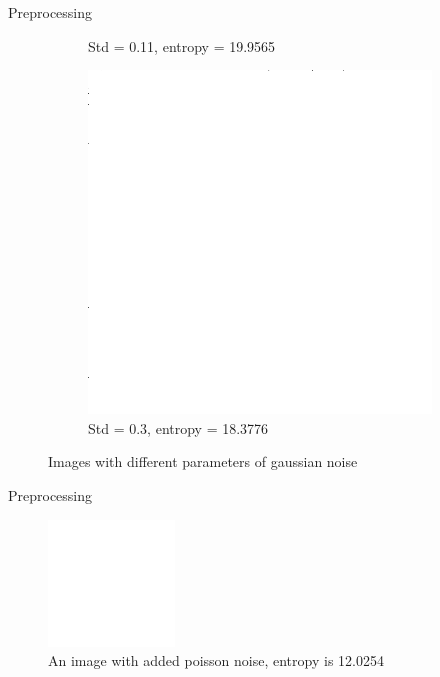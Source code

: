 \documentclass[aspectratio=1610]{beamer}
\begin{document}
\begin{frame}{Preprocessing}
\begin{figure}
\begin{subfigure}[t]{0.3\textwidth}
        \caption{Std = 0.11, \break entropy = 19.9565}
        \label{fig:noisy2}
    \end{subfigure}
    \begin{subfigure}[t]{0.3\textwidth}
        \includegraphics[width=\textwidth]{images/g_noise_high.png}
        \caption{Std = 0.3, \break entropy = 18.3776}
        \label{fig:noisy3}
    \end{subfigure}
    \caption{Images with different parameters of gaussian noise}
    \label{fig:images}
  \end{figure}
\end{frame}

\begin{frame}{Preprocessing}
  \begin{figure}
    \centering
    \includegraphics[width=0.3\textwidth]{images/p_noise.png}
    \caption{An image with added poisson noise, entropy is 12.0254}
    \label{fig:poisson}
  \end{figure}
\end{frame}
\end{document}
